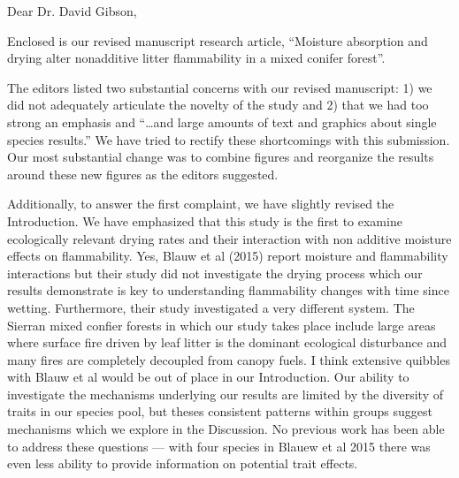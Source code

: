 \documentclass[letterpaper, 12pt]{letter}
\begin{document}
\begin{letter}{}

\opening{Dear Dr. David Gibson,}

Enclosed is our revised manuscript research article, ``Moisture absorption and
drying alter nonadditive litter flammability in a mixed conifer forest''.

The editors listed two substantial concerns with our revised manuscript: 1) we
did not adequately articulate the novelty of the study and 2) that we had too
strong an emphasis and ``\ldots and large amounts of text and graphics about
single species results.'' We have tried to rectify these shortcomings with this
submission. Our most substantial change was to combine figures and reorganize
the results around these new figures as the editors suggested.

Additionally, to answer the first complaint, we have slightly revised the
Introduction. We have emphasized that this study is the first to examine
ecologically relevant drying rates and their interaction with non additive
moisture effects on flammability. Yes, Blauw et al (2015) report moisture and
flammability interactions but their study did not investigate the drying
process which our results demonstrate is key to understanding flammability
changes with time since wetting. Furthermore, their study investigated a very
different system. The Sierran mixed confier forests in which our study takes
place include large areas where surface fire driven by leaf litter is the
dominant ecological disturbance and many fires are completely decoupled from
canopy fuels. I think extensive quibbles with Blauw et al would be out of place
in our Introduction. Our ability to investigate the mechanisms underlying our
results are limited by the diversity of traits in our species pool, but theses
consistent patterns within groups suggest mechanisms which we explore in the
Discussion. No previous work has been able to address these questions --- with
four species in Blauew et al 2015 there was even less ability to provide
information on potential trait effects.


\end{letter}
\end{document}
